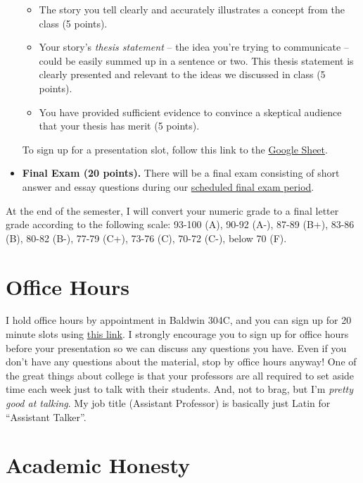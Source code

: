 \documentclass[11pt, letterpaper]{article}
\begin{document}
\begin{itemize}
\begin{itemize}
		\item The story you tell clearly and accurately illustrates a concept from the class (5 points).
		\item Your story's \textit{thesis statement} -- the idea you're trying to communicate -- could be easily summed up in a sentence or two. This thesis statement is clearly presented and relevant to the ideas we discussed in class (5 points).
		\item You have provided sufficient evidence to convince a skeptical audience that your thesis has merit (5 points).
	\end{itemize}
	To sign up for a presentation slot, follow this link to the \href{https://docs.google.com/spreadsheets/d/12a5mE-qxsg_m47bSt2t3PnnQu6zLRQ9DePzw3ObePRc/edit?usp=sharing}{Google Sheet}.
	
	\item \textbf{Final Exam (20 points).} There will be a final exam consisting of short answer and essay questions during our \href{https://reg.uga.edu/general-information/calendars/final-exam-schedule/}{scheduled final exam period}.
\end{itemize}

\noindent At the end of the semester, I will convert your numeric grade to a final letter grade according to the following scale: 93-100 (A), 90-92 (A-), 87-89 (B+), 83-86 (B), 80-82 (B-), 77-79 (C+), 73-76 (C), 70-72 (C-), below 70 (F).

\section*{Office Hours}

I hold office hours by appointment in Baldwin 304C, and you can sign up for 20 minute slots using \href{https://calendly.com/joeornstein/20min}{this link}. I strongly encourage you to sign up for office hours before your presentation so we can discuss any questions you have. Even if you don't have any questions about the material, stop by office hours anyway! One of the great things about college is that your professors are all required to set aside time each week just to talk with their students. And, not to brag, but I'm \textit{pretty good at talking}. My job title (Assistant Professor) is basically just Latin for ``Assistant Talker''.


\section*{Academic Honesty}
\end{document}
